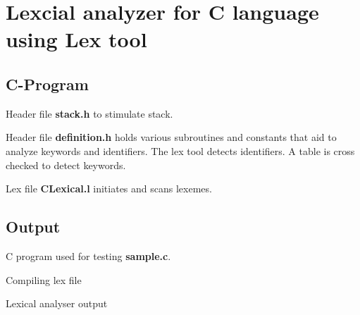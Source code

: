 \section{Lexcial analyzer for C language using Lex tool}
\subsection{C-Program}
Header file \textbf{stack.h} to stimulate stack.


\vspace{0.5cm}
Header file \textbf{definition.h} holds various subroutines and constants that aid to analyze keywords and identifiers. The lex tool detects identifiers. A table is cross checked to detect keywords.


\vspace{0.5cm}
Lex file \textbf{CLexical.l} initiates and scans lexemes.




\subsection{Output}
C program used for testing \textbf{sample.c}.



\vspace{0.5cm}
Compiling lex file


\vspace{0.5cm}
Lexical analyser output
